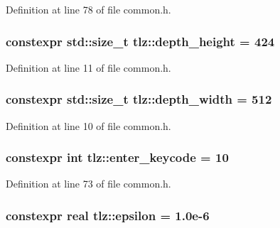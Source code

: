 Definition at line 78 of file common.\+h.

\subsubsection[{\texorpdfstring{depth\+\_\+height}{depth_height}}]{\setlength{\rightskip}{0pt plus 5cm}constexpr std\+::size\+\_\+t tlz\+::depth\+\_\+height = 424}\hypertarget{namespacetlz_ae3b52fb4f7d8e6c5498d5aedee8d9767}{}\label{namespacetlz_ae3b52fb4f7d8e6c5498d5aedee8d9767}


Definition at line 11 of file common.\+h.

\subsubsection[{\texorpdfstring{depth\+\_\+width}{depth_width}}]{\setlength{\rightskip}{0pt plus 5cm}constexpr std\+::size\+\_\+t tlz\+::depth\+\_\+width = 512}\hypertarget{namespacetlz_a501a85306cfc7e516a67b28581657227}{}\label{namespacetlz_a501a85306cfc7e516a67b28581657227}


Definition at line 10 of file common.\+h.

\subsubsection[{\texorpdfstring{enter\+\_\+keycode}{enter_keycode}}]{\setlength{\rightskip}{0pt plus 5cm}constexpr int tlz\+::enter\+\_\+keycode = 10}\hypertarget{namespacetlz_ad1e3b7cf1657f9d2d03a6024cee9c829}{}\label{namespacetlz_ad1e3b7cf1657f9d2d03a6024cee9c829}


Definition at line 73 of file common.\+h.

\subsubsection[{\texorpdfstring{epsilon}{epsilon}}]{\setlength{\rightskip}{0pt plus 5cm}constexpr {\bf real} tlz\+::epsilon = 1.\+0e-\/6}\hypertarget{namespacetlz_a7c30b7b29f4c1fc93cc06c997e4a8d07}{}\label{namespacetlz_a7c30b7b29f4c1fc93cc06c997e4a8d07}


